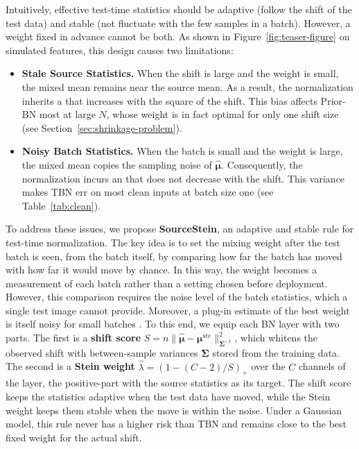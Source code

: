 Intuitively, effective test-time statistics should be adaptive (\ie follow the shift of the test data) and stable (\ie not fluctuate with the few samples in a batch).
However, a weight fixed in advance cannot be both.
As shown in Figure~\ref{fig:teaser-figure} on simulated features, this design causes two limitations:
\begin{itemize}[leftmargin=*]
    \item \textbf{Stale Source Statistics.} When the shift is large and the weight is small, the mixed mean remains near the source mean. As a result, the normalization inherits a  that increases with the square of the shift. This bias affects Prior-BN most at large $N$, whose weight is in fact optimal for only one shift size (see Section~\ref{sec:shrinkage-problem}).
    \item \textbf{Noisy Batch Statistics.} When the batch is small and the weight is large, the mixed mean copies the sampling noise of $\hat{\boldsymbol{\mu}}$. Consequently, the normalization incurs an  that does not decrease with the shift. This variance makes TBN err on most clean inputs at batch size one (see Table~\ref{tab:clean}).
\end{itemize}

To address these issues, we propose \textbf{SourceStein}, an adaptive and stable rule for test-time normalization.
The key idea is to set the mixing weight after the test batch is seen, from the batch itself, by comparing how far the batch has moved with how far it would move by chance.
In this way, the weight becomes a measurement of each batch rather than a setting chosen before deployment.
However, this comparison requires the noise level of the batch statistics, which a single test image cannot provide.
Moreover, a plug-in estimate of the best weight is itself noisy for small batches \cite{Efron-Morris}.
To this end, we equip each BN layer with two parts.
The first is a \textbf{shift score} $S = n\|\hat{\boldsymbol{\mu}} - \boldsymbol{\mu}^{\text{src}}\|^2_{\boldsymbol{\Sigma}^{-1}}$, which whitens the observed shift with between-sample variances $\boldsymbol{\Sigma}$ stored from the training data.
The second is a \textbf{Stein weight} $\hat{\lambda} = (1 - (C{-}2)/S)_+$ over the $C$ channels of the layer, \ie the positive-part  \cite{James-Stein} with the source statistics as its target.
The shift score keeps the statistics adaptive when the test data have moved, while the Stein weight keeps them stable when the move is within the noise.
Under a Gaussian model, this rule never has a higher risk than TBN and remains close to the best fixed weight for the actual shift.

